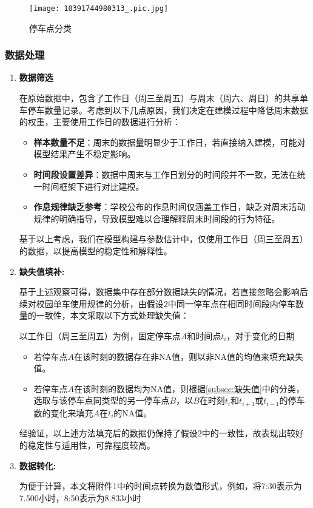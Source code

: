 \documentclass[withoutpreface,bwprint]{cumcmthesis}
\begin{document}
\begin{figure}[htbp]
  \centering
  \texttt{[image: 10391744980313\_.pic.jpg]} %
  \caption{停车点分类} 
  \label{fig:停车点分类}
\end{figure}
\subsubsection{数据处理}

\begin{enumerate}
    \item \textbf{数据筛选}

    在原始数据中，包含了工作日（周三至周五）与周末（周六、周日）的共享单车停车数量记录。考虑到以下几点原因，我们决定在建模过程中降低周末数据的权重，主要使用工作日的数据进行分析：
    
    \begin{itemize}
        \item \textbf{样本数量不足}：周末的数据量明显少于工作日，若直接纳入建模，可能对模型结果产生不稳定影响。
        \item \textbf{时间段设置差异}：数据中周末与工作日划分的时间段并不一致，无法在统一时间框架下进行对比建模。
        \item \textbf{作息规律缺乏参考}：学校公布的作息时间仅涵盖工作日，缺乏对周末活动规律的明确指导，导致模型难以合理解释周末时间段的行为特征。
    \end{itemize}

    基于以上考虑，我们在模型构建与参数估计中，仅使用工作日（周三至周五）的数据，以提高模型的稳定性和解释性。
    
    \item \textbf{缺失值填补:} 
    
    基于上述观察可得，数据集中存在部分数据缺失的情况，若直接忽略会影响后续对校园单车使用规律的分析，由假设2中同一停车点在相同时间段内停车数量的一致性，本文采取以下方式处理缺失值：\par
    以工作日（周三至周五）为例，固定停车点$A$和时间点$t_i$，对于变化的日期
    \begin{itemize}
    \item 若停车点$A$在该时刻的数据存在非NA值，则以非NA值的均值来填充缺失值。
    \item 若停车点$A$在该时刻的数据均为NA值，则根据\ref{subsec:缺失值}中的分类，选取与该停车点同类型的另一停车点$B$，以$B$在时刻$t_i$和$t_{i+1}$或$t_{i-1}$的停车数的变化来填充$A$在$t_i$的NA值。
    \end{itemize}\par
    经验证，以上述方法填充后的数据仍保持了假设2中的一致性，故表现出较好的稳定性与适用性，可靠程度较高。
    
    \item \textbf{数据转化:}
    
    为便于计算，本文将附件1中的时间点转换为数值形式，例如，将7:30表示为7.500小时，8:50表示为8.833小时
\end{enumerate}
\end{document}
